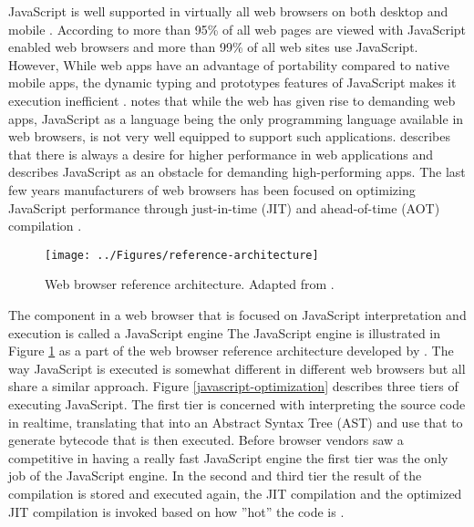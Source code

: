 JavaScript is well supported in virtually all web browsers on both desktop and mobile \parencite{Zakai2011}. According to \textcite{TiwariSolihin2012} more than 95\% of all web pages are viewed with JavaScript enabled web browsers and more than 99\% of all web sites use JavaScript. However, While web apps have an advantage of portability compared to native mobile apps, the dynamic typing and prototypes features of JavaScript makes it execution inefficient \parencite{ParkJungMoon2015}. \textcite{HaasRossbergSchuffTitzerHolmanGohmanWagnerZakaiBastien2017} notes that while the web has given rise to demanding web apps, JavaScript as a language being the only programming language available in web browsers, is not very well equipped to support such applications. \textcite{ReiserBlaser2017} describes that there is always a desire for higher performance in web applications and \textcite{Zakai2018} describes JavaScript as an obstacle for demanding high-performing apps. The last few years manufacturers of web browsers has been focused on optimizing JavaScript performance through just-in-time (JIT) and ahead-of-time (AOT) compilation \parencite{HerreraChenLavoieHendren2018}.

\begin{figure}[!h]
\centering
\texttt{[image: ../Figures/reference-architecture]}
\caption{Web browser reference architecture. Adapted from \textcite{GrosskurthGodfrey2005}.}
\label{reference-architecture}
\end{figure}

The component in a web browser that is focused on JavaScript interpretation and execution is called a JavaScript engine \parencite{JeonChoi2012} The JavaScript engine is illustrated in Figure \ref{reference-architecture} as a part of the web browser reference architecture developed by \textcite{GrosskurthGodfrey2005}. The way JavaScript is executed is somewhat different in different web browsers but all share a similar approach. Figure \ref{javascript-optimization} describes three tiers of executing JavaScript. The first tier is concerned with interpreting the source code in realtime, translating that into an Abstract Syntax Tree (AST) and use that to generate bytecode that is then executed. Before browser vendors saw a competitive in having a really fast JavaScript engine the first tier was the only job of the JavaScript engine. In the second and third tier the result of the compilation is stored and executed again, the JIT compilation and the optimized JIT compilation is invoked based on how ''hot'' the code is \parencite{KedlayaRobatmiliHardekopf2015,ParkKimParkMoon2018}.

